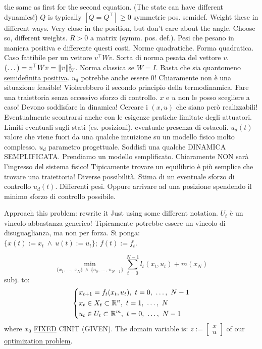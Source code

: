 the same as first for the second equation. (The state can have different dynamics!) $Q$ is typically $[Q=Q^\top]\geq 0$ symmetric pos. semidef. Weight these in different ways. Very close in the position, but don't care about the angle. Choose so, different weights. $R>0$ a matrix (symm. pos. def.). Pesi che pesano in maniera positiva e differente questi costi. Norme quadratiche. Forma quadratica. Caso fattibile per un vettore $v^\top Wv$. Sorta di norma pesata del vettore $v$. $(\dots) = v^\top Wv = \lVert v\rVert^2_W$. Norma classica se $W=I$. Basta che sia quantomeno \underline{semidefinita positiva}. $u_d$ potrebbe anche essere 0! Chiaramente non è una situazione feasible! Violerebbero il secondo principio della termodinamica. Fare una traiettoria senza eccessivo sforzo di controllo. $x$ e $u$ non le posso scegliere a caso! Devono soddisfare la dinamica! Cercare i $(x,u)$ che siano però realizzabili! Eventualmente scontrarsi anche con le esigenze pratiche limitate degli attuatori. Limiti eventuali sugli stati (es. posizioni), eventuale presenza di ostacoli. $u_d(t)$ valore che viene fuori da una qualche intuizione su un modello fisico molto complesso. $u_d$ parametro progettuale. Soddisfi una qualche DINAMICA SEMPLIFICATA. Prendiamo un modello semplificato. Chiaramente NON sarà l'ingresso del sistema fisico! Tipicamente trovare un equilibrio è più semplice che trovare una traiettoria! Diverse possibilità. Stima di un eventuale sforzo di controllo $u_d(t)$. Differenti pesi. Oppure arrivare ad una posizione spendendo il minimo sforzo di controllo possibile.

Approach this problem: rewrite it Just using some different notation. $U_t$ è un vincolo abbastanza generico! Tipicamente potrebbe essere un vincolo di disuguaglianza, ma non per forza. Si ponga: $\{x(t) := x_t\ \land\ u(t) := u_t\};\ f(t) := f_t$.

\[
	\min_{\{x_1,\ \dots,\ x_N\}\ \land\ \{u_0,\ \dots,\ u_{N-1}\}}{\sum_{t=0}^{N-1}{l_t(x_t,u_t)} + m(x_N)}
\]
subj. to:
\[
	\left\{
	\begin{aligned}
	&x_{t+1} = f_t(x_t,u_t),\ t=0,\ \dots,\ N-1\\
	&x_t\in X_t\subset\mathbb{R}^n,\ t=1,\ \dots,\ N\\
	&u_t\in U_t\subset\mathbb{R}^m,\ t=0,\ \dots,\ N-1
	\end{aligned}
	\right.
\]
where $x_0$ \underline{FIXED} CINIT (GIVEN). The domain variable is: \newline $z := \begin{bmatrix}x\\u\end{bmatrix}$ of our \underline{optimization problem}.

